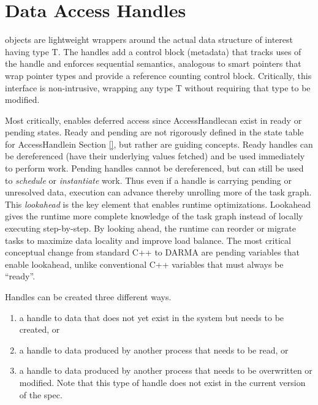 \newcommand{\ahandle}{AccessHandle}
\newcommand{\ahandleT}{AccessHandle<T>}
\newcommand{\cwork}{\inlinecode{create_work}}

\section{Data Access Handles}
\label{sec:handles}
 objects are lightweight wrappers around the actual data structure of interest having type T. 
The handles add a control block (metadata) that tracks uses of the handle and enforces
\gls{sequential semantics}, analogous to smart pointers that wrap pointer types and provide a reference counting control block.
Critically, this interface is non-intrusive, wrapping any type T without requiring that type to be modified.

Most critically,  enables deferred access since \ahandle can exist in ready or pending states. 
Ready and pending are not rigorously defined in the state table for \ahandle in Section \ref{}, but rather are guiding concepts.
Ready handles can be dereferenced (have their underlying values fetched) and be used immediately to perform work.
Pending handles cannot be dereferenced, but can still be used to \emph{schedule} or \emph{instantiate} work.
Thus even if a handle is carrying pending or unresolved data, execution can advance thereby unrolling more of the task graph.
This \emph{lookahead} is the key element that enables runtime optimizations.
Lookahead gives the runtime more complete knowledge of the task graph instead of locally executing step-by-step.
By looking ahead, the runtime can reorder or migrate tasks to maximize data locality and improve load balance.
The most critical conceptual change from standard C++ to DARMA are pending variables that enable lookahead, unlike conventional C++ variables that must always be ``ready''.


Handles can be created three different ways.
\begin{enumerate}
\item a handle to data that does not yet exist in the system
but needs to be created, or
\item a handle to data produced by another process that needs to
be read, or 
\item a handle to data produced by another process that needs to be overwritten or modified. 
Note that this type of handle does not exist in the current version of the spec.
\end{enumerate}


